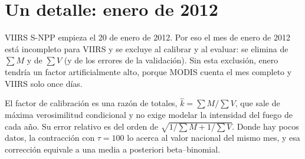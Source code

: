 \section{Un detalle: enero de 2012}

VIIRS S-NPP empieza el 20 de enero de 2012. Por eso el mes de enero de 2012 está incompleto para VIIRS y se excluye al calibrar y al evaluar: se elimina de $\sum M$ y de $\sum V$ (y de los errores de la validación). Sin esta exclusión, enero tendría un factor artificialmente alto, porque MODIS cuenta el mes completo y VIIRS solo once días.

\begin{ideaclave}
El factor de calibración es una razón de totales, $\widehat k=\sum M/\sum V$, que sale de máxima verosimilitud condicional y no exige modelar la intensidad del fuego de cada año. Su error relativo es del orden de $\sqrt{1/\sum M+1/\sum V}$. Donde hay pocos datos, la contracción con $\tau=100$ lo acerca al valor nacional del mismo mes, y esa corrección equivale a una media a posteriori beta--binomial.
\end{ideaclave}
